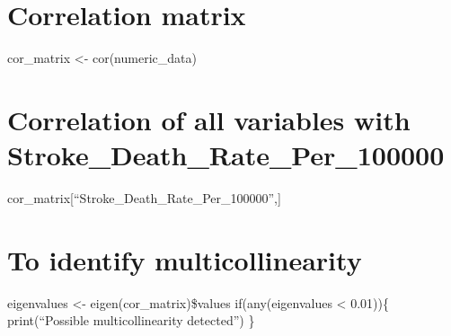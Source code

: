 \documentclass[
]{article}
\begin{document}
\hypertarget{correlation-matrix}{%
\section{Correlation matrix}\label{correlation-matrix}}

cor\_matrix \textless- cor(numeric\_data)

\hypertarget{correlation-of-all-variables-with-stroke_death_rate_per_100000}{%
\section{Correlation of all variables with
Stroke\_Death\_Rate\_Per\_100000}\label{correlation-of-all-variables-with-stroke_death_rate_per_100000}}

cor\_matrix{[}``Stroke\_Death\_Rate\_Per\_100000'',{]}

\hypertarget{to-identify-multicollinearity}{%
\section{To identify
multicollinearity}\label{to-identify-multicollinearity}}

eigenvalues \textless- eigen(cor\_matrix)\$values if(any(eigenvalues
\textless{} 0.01))\{ print(``Possible multicollinearity detected'') \}
\end{document}
